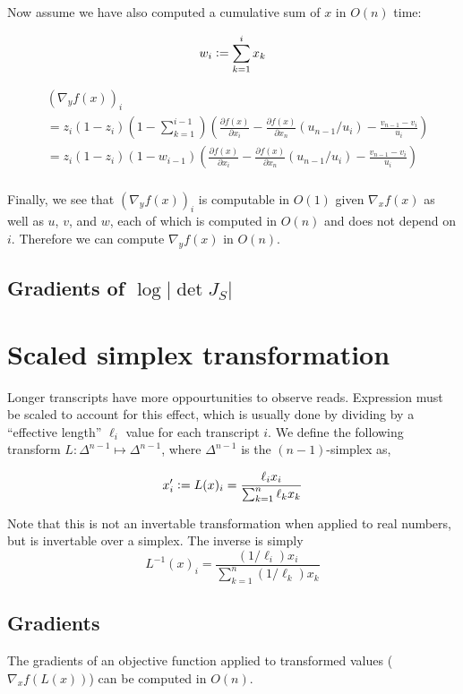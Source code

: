 \documentclass{article}
\newcommand{\defeq}{\vcentcolon=}
\begin{document}
Now assume we have also computed a cumulative sum of $x$ in $O(n)$ time:

$$w_i \defeq \sum_{k=1}^i x_k$$

\begin{align}
&\left( \nabla_y f(x) \right)_i \\
&=
z_i (1 - z_i) \left(1 - \sum_{k=1}^{i-1} \right) \left(
\frac{\partial f(x)}{\partial x_i}
- \frac{\partial f(x)}{\partial x_n} (u_{n-1} / u_i)
- \frac{v_{n-1} - v_i}{u_i} \right) \\
&=
z_i (1 - z_i) (1 - w_{i-1} ) \left(
\frac{\partial f(x)}{\partial x_i}
- \frac{\partial f(x)}{\partial x_n} (u_{n-1} / u_i)
- \frac{v_{n-1} - v_i}{u_i} \right) \\
\end{align}

Finally, we see that $\left( \nabla_y f(x) \right)_i$ is computable in $O(1)$
given $\nabla_x f(x)$ as well as $u$, $v$, and $w$, each of which is computed in
$O(n)$ and does not depend on $i$. Therefore we can compute $\nabla_y f(x)$ in
$O(n)$.


\subsection{Gradients of $\log |\det J_{S}|$}


\section{Scaled simplex transformation}

Longer transcripts have more oppourtunities to observe reads. Expression must be
scaled to account for this effect, which is usually done by dividing by a
``effective length'' $\ell_i$ value for each transcript $i$. We define the
following transform $L: \Delta^{n-1} \mapsto \Delta^{n-1}$, where $\Delta^{n-1}$
is the $(n-1)$-simplex as,

$$
x'_i \defeq L(x)_i = \frac{\ell_i x_i}{\sum_{k=1}^{n} \ell_k x_k}
$$

Note that this is not an invertable transformation when applied to real numbers,
but is invertable over a simplex. The inverse is simply $$L^{-1}(x)_i =
\frac{(1/\ell_i) x_i}{\sum_{k=1}^{n} (1/\ell_k) x_k}$$

\subsection{Gradients}

The gradients of an objective function applied to transformed values ($\nabla_x
f(L(x))$) can be computed in $O(n)$.
\end{document}
